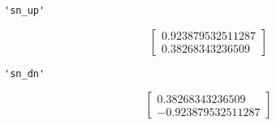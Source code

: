 \documentclass[11pt]{article}
\begin{document}
    
    \begin{verbatim}
'sn_up'
    \end{verbatim}

    
    $$\left[\begin{matrix}0.923879532511287\\0.38268343236509\end{matrix}\right]$$

    
    
    \begin{verbatim}
'sn_dn'
    \end{verbatim}

    
    $$\left[\begin{matrix}0.38268343236509\\-0.923879532511287\end{matrix}\right]$$
\end{document}
